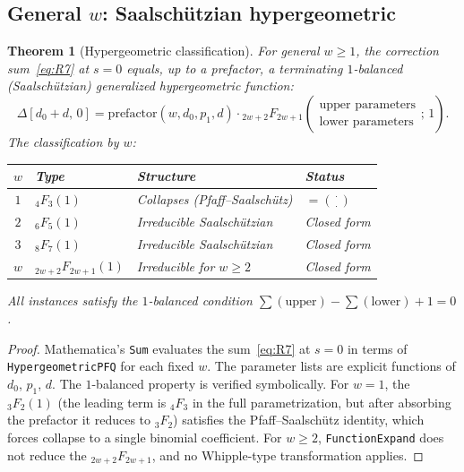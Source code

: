 \documentclass[11pt]{article}
\newtheorem{theorem}{Theorem}[section]
\theoremstyle{definition}
\theoremstyle{remark}
\newcommand{\pFq}[2]{{}_{#1}F_{#2}}
\begin{document}
\subsection{General $w$: Saalsch\"utzian hypergeometric}

\begin{theorem}[Hypergeometric classification]%
\label{thm:hypergeom}
For general $w \geq 1$, the correction
sum~\eqref{eq:R7} at $s = 0$ equals, up to a prefactor, a
terminating $1$-balanced (Saalsch\"utzian) generalized
hypergeometric function:
\[
  \Delta[d_0{+}d,\, 0] = \mathrm{prefactor}(w, d_0, p_1, d)
  \cdot \pFq{2w+2}{2w+1}\!\left(
    \begin{matrix}
      \text{upper parameters} \\
      \text{lower parameters}
    \end{matrix}
  ;\, 1\right).
\]
The classification by $w$:
\begin{center}
\begin{tabular}{clll}
\toprule
$w$ & Type & Structure & Status \\
\midrule
$1$ & $\pFq{4}{3}(1)$ & Collapses (Pfaff--Saalsch\"utz) & $= \binom{\cdot}{\cdot}$ \\
$2$ & $\pFq{6}{5}(1)$ & Irreducible Saalsch\"utzian & Closed form \\
$3$ & $\pFq{8}{7}(1)$ & Irreducible Saalsch\"utzian & Closed form \\
$w$ & $\pFq{2w+2}{2w+1}(1)$ & Irreducible for $w \geq 2$ & Closed form \\
\bottomrule
\end{tabular}
\end{center}
All instances satisfy the $1$-balanced condition
$\sum(\text{upper}) - \sum(\text{lower}) + 1 = 0$.
\end{theorem}

\begin{proof}
Mathematica's \texttt{Sum} evaluates the
sum~\eqref{eq:R7} at $s = 0$ in terms of
\texttt{HypergeometricPFQ} for each fixed $w$.
The parameter lists are explicit functions of $d_0$, $p_1$, $d$.
The $1$-balanced property is verified symbolically.
For $w = 1$, the $\pFq{3}{2}(1)$ (the leading term is
$\pFq{4}{3}$ in the full parametrization, but after absorbing
the prefactor it reduces to $\pFq{3}{2}$) satisfies the
Pfaff--Saalsch\"utz identity, which forces collapse to a single
binomial coefficient.
For $w \geq 2$, \texttt{FunctionExpand} does not reduce the
$\pFq{2w+2}{2w+1}$, and no Whipple-type transformation applies.
\end{proof}
\end{document}

